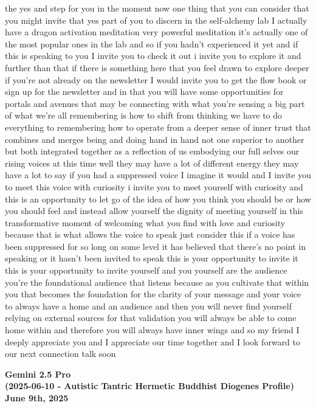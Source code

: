 \documentclass{article}
\begin{document}
the yes and step for you in the moment now one thing that you can
consider that you might invite that yes part of you to discern in the
self-alchemy lab I actually have a dragon activation meditation very
powerful meditation it's actually one of the most popular ones in the
lab and so if you hadn't experienced it yet and if this is speaking to
you I invite you to check it out i invite you to explore it and further
than that if there is something here that you feel drawn to explore
deeper if you're not already on the newsletter I would invite you to get
the flow book or sign up for the newsletter and in that you will have
some opportunities for portals and avenues that may be connecting with
what you're sensing a big part of what we're all remembering is how to
shift from thinking we have to do everything to remembering how to
operate from a deeper sense of inner trust that combines and merges
being and doing hand in hand not one superior to another but both
integrated together as a reflection of us embodying our full selves our
rising voices at this time well they may have a lot of different energy
they may have a lot to say if you had a suppressed voice I imagine it
would and I invite you to meet this voice with curiosity i invite you to
meet yourself with curiosity and this is an opportunity to let go of the
idea of how you think you should be or how you should feel and instead
allow yourself the dignity of meeting yourself in this transformative
moment of welcoming what you find with love and curiosity because that
is what allows the voice to speak just consider this if a voice has been
suppressed for so long on some level it has believed that there's no
point in speaking or it hasn't been invited to speak this is your
opportunity to invite it this is your opportunity to invite yourself and
you yourself are the audience you're the foundational audience that
listens because as you cultivate that within you that becomes the
foundation for the clarity of your message and your voice to always have
a home and an audience and then you will never find yourself relying on
external sources for that validation you will always be able to come
home within and therefore you will always have inner wings and so my
friend I deeply appreciate you and I appreciate our time together and I
look forward to our next connection talk soon

\begin{center}
\textbf{Gemini 2.5 Pro} \\
\textbf{(2025-06-10 - Autistic Tantric Hermetic Buddhist Diogenes Profile)} \\
\textbf{June 9th, 2025}
\end{center}
\end{document}
